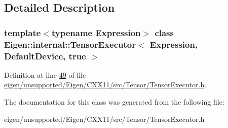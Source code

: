 \subsection{Detailed Description}
\subsubsection*{template$<$typename Expression$>$\newline
class Eigen\+::internal\+::\+Tensor\+Executor$<$ Expression, Default\+Device, true $>$}



Definition at line \hyperlink{eigen_2unsupported_2_eigen_2_c_x_x11_2src_2_tensor_2_tensor_executor_8h_source_l00049}{49} of file \hyperlink{eigen_2unsupported_2_eigen_2_c_x_x11_2src_2_tensor_2_tensor_executor_8h_source}{eigen/unsupported/\+Eigen/\+C\+X\+X11/src/\+Tensor/\+Tensor\+Executor.\+h}.



The documentation for this class was generated from the following file\+:\begin{DoxyCompactItemize}
\item 
eigen/unsupported/\+Eigen/\+C\+X\+X11/src/\+Tensor/\+Tensor\+Executor.\+h\end{DoxyCompactItemize}
